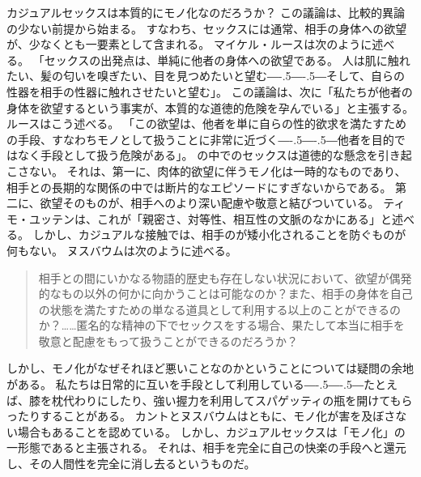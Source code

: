 \documentclass[paper=a4,book,openany]{jlreq}
\def\DDASH{―\kern-.5\zw―\kern-.5\zw―} %
\begin{document}
カジュアルセックスは本質的にモノ化なのだろうか？ この議論は、比較的異論の少ない前提から始まる。
すなわち、セックスには通常、相手の身体への欲望が、少なくとも一要素として含まれる。
マイケル・ルースは次のように述べる。
「セックスの出発点は、単純に他者の身体への欲望である。
人は肌に触れたい、髪の匂いを嗅ぎたい、目を見つめたいと望む{\DDASH}そして、自らの性器を相手の性器に触れさせたいと望む」。
この議論は、次に「私たちが他者の身体を欲望するという事実が、本質的な道徳的危険を孕んでいる」と主張する。
ルースはこう述べる。
「この欲望は、他者を単に自らの性的欲求を満たすための手段、すなわちモノとして扱うことに非常に近づく{\DDASH}他者を目的ではなく手段として扱う危険がある」\citep[p. 185]{ruse88:_homos}。
の中でのセックスは道徳的な懸念を引き起こさない。
それは、第一に、肉体的欲望に伴うモノ化は一時的なものであり、相手との長期的な関係の中では断片的なエピソードにすぎないからである。
第二に、欲望そのものが、相手へのより深い配慮や敬意と結びついている。
ティモ・ユッテンは、これが「親密さ、対等性、相互性の文脈のなかにある」と述べる\citep[p. 31]{jutten16:_sexual_objec}。
しかし、カジュアルな接触では、相手のが矮小化されることを防ぐものが何もない。
ヌスバウムは次のように述べる。

\begin{quote}
  相手との間にいかなる物語的歴史も存在しない状況において、欲望が偶発的なもの以外の何かに向かうことは可能なのか？また、相手の身体を自己の状態を満たすための単なる道具として利用する以上のことができるのか？……匿名的な精神の下でセックスをする場合、果たして本当に相手を敬意と配慮をもって扱うことができるのだろうか？\citep[p. 287]{nussbaum95:_objec}
\end{quote}

しかし、モノ化がなぜそれほど悪いことなのかということについては疑問の余地がある。
私たちは日常的に互いを手段として利用している{\DDASH}たとえば、膝を枕代わりにしたり、強い握力を利用してスパゲッティの瓶を開けてもらったりすることがある。
カントとヌスバウムはともに、モノ化が害を及ぼさない場合もあることを認めている。
しかし、カジュアルセックスは「モノ化」の一形態であると主張される。
それは、相手を完全に自己の快楽の手段へと還元し、その人間性を完全に消し去るというものだ。
\end{document}
